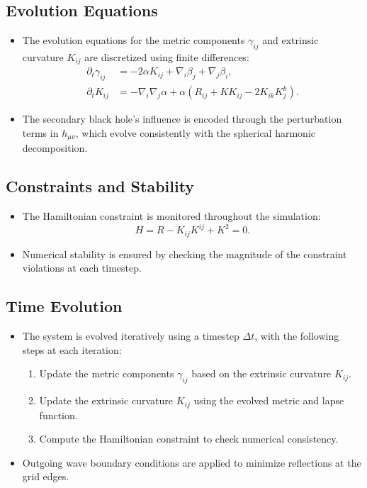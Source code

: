 \documentclass[12pt]{article}
\begin{document}
\subsection{Evolution Equations}
\begin{itemize}
    \item The evolution equations for the metric components $\gamma_{ij}$ and extrinsic curvature $K_{ij}$ are discretized using finite differences:
    \begin{align*}
        \partial_t \gamma_{ij} &= -2\alpha K_{ij} + \nabla_i \beta_j + \nabla_j \beta_i, \\
        \partial_t K_{ij} &= -\nabla_i \nabla_j \alpha + \alpha \left( R_{ij} + K K_{ij} - 2 K_{ik} K^k_j \right).
    \end{align*}
    \item The secondary black hole's influence is encoded through the perturbation terms in $h_{\mu\nu}$, which evolve consistently with the spherical harmonic decomposition.
\end{itemize}

\subsection{Constraints and Stability}
\begin{itemize}
    \item The Hamiltonian constraint is monitored throughout the simulation:
    \[
    H = R - K_{ij} K^{ij} + K^2 = 0.
    \]
    \item Numerical stability is ensured by checking the magnitude of the constraint violations at each timestep.
\end{itemize}

\subsection{Time Evolution}
\begin{itemize}
    \item The system is evolved iteratively using a timestep $\Delta t$, with the following steps at each iteration:
    \begin{enumerate}
        \item Update the metric components $\gamma_{ij}$ based on the extrinsic curvature $K_{ij}$.
        \item Update the extrinsic curvature $K_{ij}$ using the evolved metric and lapse function.
        \item Compute the Hamiltonian constraint to check numerical consistency.
    \end{enumerate}
    \item Outgoing wave boundary conditions are applied to minimize reflections at the grid edges.
\end{itemize}
\end{document}
